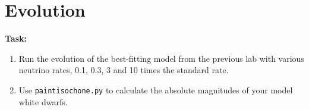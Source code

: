\documentclass{article}
\begin{document}

\section{Evolution}

\textbf{Task:}
\begin{enumerate}
    \item 
Run the evolution of the best-fitting model from the previous lab with various neutrino rates, 0.1, 0.3, 3 and 10 times the standard rate.
\item Use \texttt{paintisochone.py} to calculate the absolute magnitudes of your model white dwarfs.
\end{enumerate}


\end{document}
